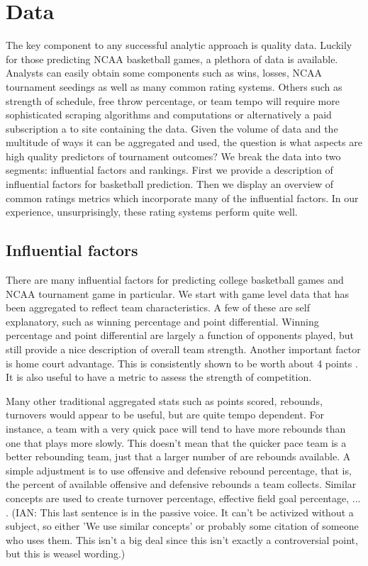 \section{Data}
The key component to any successful analytic approach is quality data.  Luckily for those predicting NCAA basketball games, a plethora of data is available.  Analysts can easily obtain some components such as wins, losses, NCAA tournament seedings as well as many common rating systems.  Others such as strength of schedule, free throw percentage, or team tempo will require more sophisticated scraping algorithms and computations or alternatively a paid subscription a to site containing the data.  Given the volume of data and the multitude of ways it can be aggregated and used, the question is what aspects are high quality predictors of tournament outcomes?  We break the data into two segments: influential factors and rankings.  First we provide a description of influential factors for basketball prediction.  Then we display an overview of common ratings metrics which incorporate many of the influential factors.  In our experience, unsurprisingly, these rating systems perform quite well.

\subsection{Influential factors} 
There are many influential factors for predicting college basketball games and NCAA tournament game in particular.  We start with game level data that has been aggregated to reflect team characteristics.  A few of these are self explanatory, such as winning percentage and point differential.  Winning percentage and point differential are largely a function of opponents played, but still provide a nice description of overall team strength.  Another important factor is home court advantage.  This is consistently shown to be worth about 4 points \cite{harville1994}.  It is also useful to have a metric to assess the strength of competition.

Many other traditional aggregated stats such as points scored, rebounds, turnovers would appear to be useful, but are quite tempo dependent.  For instance, a team with a very quick pace will tend to have more rebounds than one that plays more slowly.  This doesn't mean that the quicker pace team is a better rebounding team, just that a larger number of are rebounds available.  A simple adjustment is to use offensive and defensive rebound percentage, that is, the percent of available offensive and defensive rebounds a team collects.  Similar concepts are used to create turnover percentage, effective field goal percentage, ... . (IAN: This last sentence is in the passive voice. It can't be activized without a subject, so either 'We use similar concepts' or probably some citation of someone who uses them. This isn't a big deal since this isn't exactly a controversial point, but this is weasel wording.)

